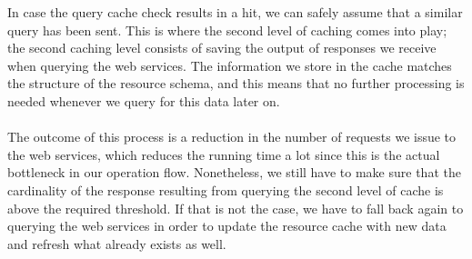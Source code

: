 In case the query cache check results in a hit, we can safely assume that a similar query has been sent. This is where the second level of caching comes into play; the second caching level consists of saving the output of responses we receive when querying the web services. The information we store in the cache matches the structure of the resource schema, and this means that no further processing is needed whenever we query for this data later on.\\\\
The outcome of this process is a reduction in the number of requests we issue to the web services, which reduces the running time a lot since this is the actual bottleneck in our operation flow. Nonetheless, we still have to make sure that the cardinality of the response resulting from querying the second level of cache is above the required threshold. If that is not the case, we have to fall back again to querying the web services in order to update the resource cache with new data and refresh what already exists as well.